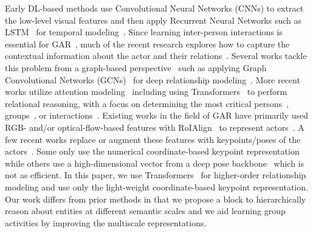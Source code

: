 \documentclass[runningheads]{llncs}
\begin{document}
Early DL-based 
methods use Convolutional Neural Networks (CNNs) to extract 
the low-level visual 
features and then apply 
Recurrent Neural Networks
such as LSTM~\cite{hochreiter1997long} 
for temporal modeling~\cite{wang2017recurrent,shu2017cern,li2017sbgar,kim2018discriminative}.
Since learning inter-person interactions is essential for GAR~\cite{wu2021comprehensive}, much of the recent research explores how to capture the contextual information about the actor and their relations~\cite{ibrahim2018hierarchical,azar2019convolutional,arg,prl,pramono2020empowering}.
Several works tackle this problem from a graph-based perspective~\cite{ibrahim2018hierarchical,lu2019gaim,sam,higcin}
such as applying Graph Convolutional Networks (GCNs)~\cite{kipf2016semi} 
for deep relationship modeling~\cite{arg}. 
More recent works utilize attention modeling~\cite{stagnet,xu2020group,lu2019gaim,yuan2021learning} including using 
Transformers~\cite{actor-transformer,GroupFormer}
to perform relational reasoning,
with a focus on determining the most critical persons~\cite{arg,actor-transformer,pramono2020empowering,yuan2021learning}, groups~\cite{ehsanpour2020joint,GroupFormer}, or
interactions~\cite{sam}.
Existing works 
in the field of GAR
have primarily used RGB- and/or optical-flow-based features with RoIAlign~\cite{he2017mask} to represent actors~\cite{higcin,stagnet,arg,ssu}.
A few recent works replace or augment these features with keypoints/poses of the actors~\cite{lu2019spatio,chen2019group,POGARS,GroupFormer}. 
Some 
only 
use
the numerical coordinate-based keypoint  representation~\cite{zappardino2021learning,POGARS,GIRN,pramono2020empowering} while others
use a high-dimensional vector  
from a deep pose backbone~\cite{actor-transformer,yuan2021learning} which is not as efficient.
 In this paper, we use Transformers~\cite{vaswani2017attention}
 for higher-order relationship modeling and use only 
 the light-weight coordinate-based
 keypoint representation. 
Our work differs from prior methods 
in that we propose a \mtx block to hierarchically reason about entities at different semantic scales and we aid learning group activities by improving the multiscale representations. 

 
\end{document}
